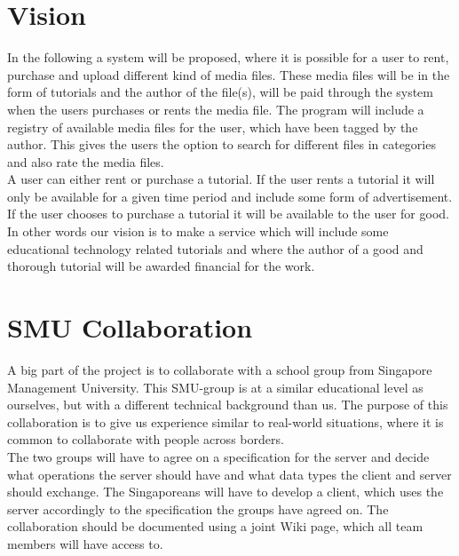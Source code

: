 \section{Vision}
In the following a system will be proposed, where it is possible for a user to rent, purchase and upload different kind of media files. These media files will be in the form of tutorials and the author of the file(s), will be paid through the system when the users purchases or rents the media file. The program will include a registry of available media files for the user, which have been tagged by the author. This gives the users the option to search for different files in categories and also rate the media files.\\

A user can either rent or purchase a tutorial. If the user rents a tutorial it will only be available for a given time period and include some form of advertisement. If the user chooses to purchase a tutorial it will be available to the user for good. \\ 
In other words our vision is to make a service which will include some educational technology related tutorials and  where the author of a good and thorough tutorial will be awarded financial for the work.

\section{SMU Collaboration}
A big part of the project is to collaborate with a school group from Singapore Management University. This SMU-group is at a similar educational level as ourselves, but with a different technical background than us. The purpose of this collaboration is to give us experience similar to real-world situations, where it is common to collaborate with people across borders.\\
The two groups will have to agree on a specification for the server and decide what operations the server should have and what data types the client and server should exchange.
The Singaporeans will have to develop a client, which uses the server accordingly to the specification the groups have agreed on. The collaboration should be documented using a joint Wiki page, which all team members will have access to. 

